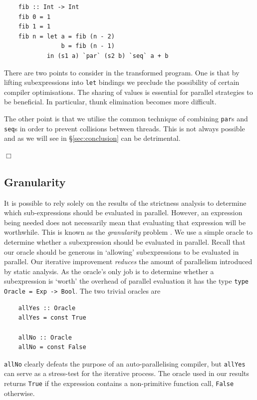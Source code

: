 \begin{verbatim}
    fib :: Int -> Int
    fib 0 = 1
    fib 1 = 1
    fib n = let a = fib (n - 2)
                b = fib (n - 1)
            in (s1 a) `par` (s2 b) `seq` a + b
\end{verbatim}

There are two points to consider in the transformed program. One is that by lifting
subexpressions into \verb-let- bindings we preclude the possibility of certain compiler
optimisations. The sharing of values is essential for parallel strategies to be beneficial.
In particular, thunk elimination becomes more difficult.

The other point is that we utilise the common technique of combining \verb-par-s
and \verb-seq-s in order to prevent collisions between threads. This is not always
possible and as we will see in \S \ref{sec:conclusion} can be detrimental.

\hfill$\Box$

\subsection{Granularity}

It is possible to rely solely on the results of the strictness analysis to
determine which sub-expressions should be evaluated in parallel. However, an
expression being needed does not necessarily mean that evaluating that
expression will be worthwhile. This is known as the \emph{granularity} problem
\citep{hammond2000research}. We use a simple oracle to determine whether a
subexpression should be evaluated in parallel. Recall that our oracle should be
generous in `allowing' subexpressions to be evaluated in parallel. Our
iterative improvement \emph{reduces} the amount of parallelism introduced by
static analysis. As the oracle's only job is to determine whether a
subexpression is `worth' the overhead of parallel evaluation it has the type
\verb+type Oracle = Exp -> Bool+. The two trivial oracles are

\begin{verbatim}
    allYes :: Oracle
    allYes = const True

    allNo :: Oracle
    allNo = const False
\end{verbatim}

\verb-allNo- clearly defeats the purpose of an auto-parallelising compiler, but
\verb-allYes- can serve as a stress-test for the iterative process. The oracle
used in our results returns \verb-True- if the expression contains a non-primitive
function call, \verb-False- otherwise.

